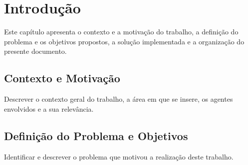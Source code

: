 %


\chapter{Introdução}
\label{cap:introducao}

Este capítulo apresenta o contexto e a motivação do trabalho, a definição do problema e os objetivos propostos, a solução implementada e a organização do presente documento.

\section{Contexto e Motivação}
\label{sec:contexto_motivacao}

Descrever o contexto geral do trabalho, a área em que se insere, os agentes envolvidos e a sua relevância.

\section{Definição do Problema e Objetivos}
\label{sec:problema_objetivos}

Identificar e descrever o problema que motivou a realização deste trabalho.

